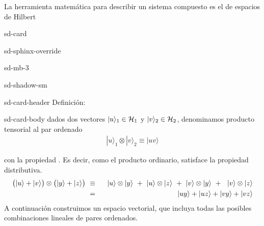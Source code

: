 \documentclass[letterpaper,10pt,english]{jupyterBook}
\newcommand{\ket}[1]{|#1\rangle}
\newcommand{\Hil}{{\cal H}}
\begin{document}
\sphinxAtStartPar
La herramienta matemática para describir un sistema compuesto es el  de espacios de Hilbert

\begin{sphinxuseclass}{sd-card}
\begin{sphinxuseclass}{sd-sphinx-override}
\begin{sphinxuseclass}{sd-mb-3}
\begin{sphinxuseclass}{sd-shadow-sm}
\begin{sphinxuseclass}{sd-card-header}
\sphinxAtStartPar
Definición:

\end{sphinxuseclass}
\begin{sphinxuseclass}{sd-card-body}
\sphinxAtStartPar
dados dos vectores \(\ket{u}_1\in \Hil_1\) y  \(\ket{v}_2\in \Hil_2\), denominamos producto tensorial al par ordenado
\begin{equation*}
\begin{split}
 \ket{u}_1\otimes \ket{v}_2 \equiv \ket{uv}
\end{split}
\end{equation*}
\end{sphinxuseclass}
\end{sphinxuseclass}
\end{sphinxuseclass}
\end{sphinxuseclass}
\end{sphinxuseclass}
\sphinxAtStartPar
con la propiedad . Es decir, como el producto ordinario, satisface la propiedad distributiva.
\label{equation:docs/Part_01_Formalismo/Chapter_01_02_Formalismo_matemático/01_04_Tensores_myst:fcdbd556-f7c2-41f9-8185-2548c52466a7}\begin{eqnarray}
\big(\ket{u}+\ket{v}\big)\otimes \big(\ket{y}+\ket{z}\big) ~&\equiv &~~
\ket{u}\otimes\ket{y} ~+~ \ket{u}\otimes\ket{z} ~+~ \ket{v}\otimes\ket{y} ~+~~
 \ket{v}\otimes\ket{z} \\
 \rule{0mm}{8mm}
 &=& \ket{uy} + \ket{uz} + \ket{vy} + \ket{vz}
\end{eqnarray}
\sphinxAtStartPar
A continuación construimos un espacio vectorial, que incluya todas las posibles combinaciones lineales de pares ordenados.
\end{document}
